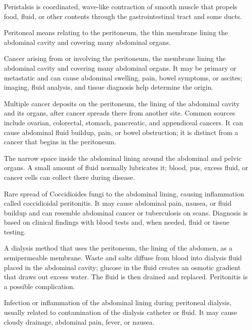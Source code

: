  Peristalsis is coordinated, wave-like contraction of smooth muscle that propels food, fluid, or other contents through the gastrointestinal tract and some ducts.

 Peritoneal means relating to the peritoneum, the thin membrane lining the abdominal cavity and covering many abdominal organs.

 Cancer arising from or involving the peritoneum, the membrane lining the abdominal cavity and covering many abdominal organs. It may be primary or metastatic and can cause abdominal swelling, pain, bowel symptoms, or ascites; imaging, fluid analysis, and tissue diagnosis help determine the origin.

 Multiple cancer deposits on the peritoneum, the lining of the abdominal cavity and its organs, after cancer spreads there from another site. Common sources include ovarian, colorectal, stomach, pancreatic, and appendiceal cancers. It can cause abdominal fluid buildup, pain, or bowel obstruction; it is distinct from a cancer that begins in the peritoneum.

 The narrow space inside the abdominal lining around the abdominal and pelvic organs. A small amount of fluid normally lubricates it; blood, pus, excess fluid, or cancer cells can collect there during disease.

 Rare spread of Coccidioides fungi to the abdominal lining, causing inflammation called coccidioidal peritonitis. It may cause abdominal pain, nausea, or fluid buildup and can resemble abdominal cancer or tuberculosis on scans. Diagnosis is based on clinical findings with blood tests and, when needed, fluid or tissue testing.

 A dialysis method that uses the peritoneum, the lining of the abdomen, as a semipermeable membrane. Waste and salts diffuse from blood into dialysis fluid placed in the abdominal cavity; glucose in the fluid creates an osmotic gradient that draws out excess water. The fluid is then drained and replaced. Peritonitis is a possible complication.

 Infection or inflammation of the abdominal lining during peritoneal dialysis, usually related to contamination of the dialysis catheter or fluid. It may cause cloudy drainage, abdominal pain, fever, or nausea.

